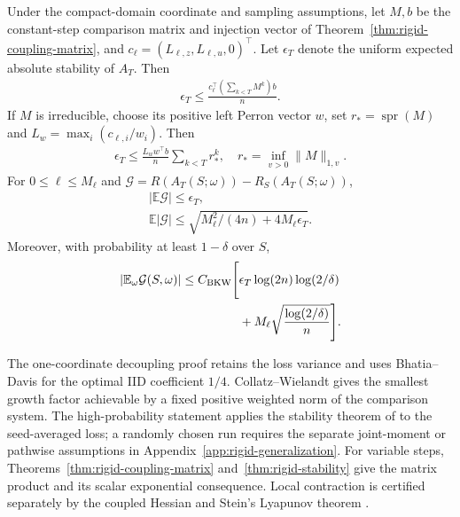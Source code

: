 \begin{theorem}
Under the compact-domain coordinate and sampling assumptions, let $M,b$ be the constant-step comparison matrix and injection vector of Theorem~\ref{thm:rigid-coupling-matrix}, and $c_\ell=(L_{\ell,z},L_{\ell,u},0)^\top$. Let $\epsilon_T$ denote the uniform expected absolute stability of $A_T$. Then
\begin{gather}
 \epsilon_T\le\frac{c_\ell^\top(\sum_{k<T}M^k)b}{n}.
\end{gather}
If $M$ is irreducible, choose its positive left Perron vector $w$, set $r_*=\operatorname{spr}(M)$ and $L_w=\max_i(c_{\ell,i}/w_i)$. Then
\begin{gather}
 \epsilon_T\le\frac{L_ww^\top b}{n}\sum_{k<T}r_*^k,\quad
 r_*=\inf_{v>0}\|M\|_{1,v}.
\end{gather}
For $0\le\ell\le M_\ell$ and $\mathcal G=R(A_T(S;\omega))-R_S(A_T(S;\omega))$,
\begin{gather}
 |\mathbb E\mathcal G|\le\epsilon_T,\\
 \mathbb E|\mathcal G|\le\sqrt{M_\ell^2/(4n)+4M_\ell\epsilon_T}.
\end{gather}
Moreover, with probability at least $1-\delta$ over $S$,
\begin{gather}
 \begin{aligned}
 |\mathbb E_\omega\mathcal G(S,\omega)|
 \le C_{\rm BKW}\Bigg[{}&\epsilon_T\log(2n)\log(2/\delta)\\
 &+M_\ell\sqrt{\frac{\log(2/\delta)}n}\Bigg].
 \end{aligned}
\end{gather}
\end{theorem}
The one-coordinate decoupling proof retains the loss variance and uses Bhatia--Davis \citep{bhatia2000variance} for the optimal IID coefficient $1/4$. Collatz--Wielandt \citep{horn2013matrix} gives the smallest growth factor achievable by a fixed positive weighted norm of the comparison system. The high-probability statement applies the stability theorem of \citet{bousquet2020sharper} to the seed-averaged loss; a randomly chosen run requires the separate joint-moment or pathwise assumptions in Appendix~\ref{app:rigid-generalization}. For variable steps, Theorems~\ref{thm:rigid-coupling-matrix} and~\ref{thm:rigid-stability} give the matrix product and its scalar exponential consequence. Local contraction is certified separately by the coupled Hessian and Stein's Lyapunov theorem \citep{stein1952iterants}.

